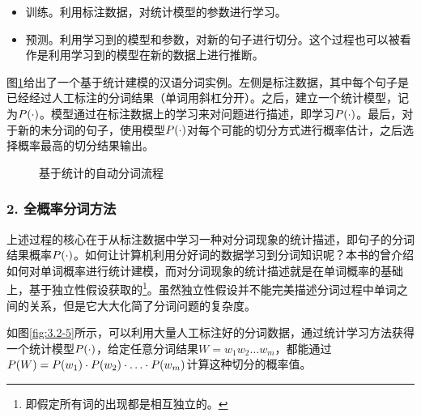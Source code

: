 \begin{itemize}
\vspace{0.5em}
\item 训练。利用标注数据，对统计模型的参数进行学习。
\vspace{0.5em}
\item 预测。利用学习到的模型和参数，对新的句子进行切分。这个过程也可以被看作是利用学习到的模型在新的数据上进行推断。
\vspace{0.5em}
\end{itemize}

\parinterval 图\ref{fig:3.2-4}给出了一个基于统计建模的汉语分词实例。左侧是标注数据，其中每个句子是已经经过人工标注的分词结果（单词用斜杠分开）。之后，建立一个统计模型，记为${P}(\cdot)$。模型通过在标注数据上的学习来对问题进行描述，即学习${P}(\cdot)$。最后，对于新的未分词的句子，使用模型${P}(\cdot)$对每个可能的切分方式进行概率估计，之后选择概率最高的切分结果输出。

\begin{figure}[htp]
\centering

\caption{基于统计的自动分词流程}
\label{fig:3.2-4}
\end{figure}


\subsubsection{2. 全概率分词方法}

\parinterval 上述过程的核心在于从标注数据中学习一种对分词现象的统计描述，即句子的分词结果概率${P}(\cdot)$。如何让计算机利用分好词的数据学习到分词知识呢？本书的{\chaptertwo}曾介绍如何对单词概率进行统计建模，而对分词现象的统计描述就是在单词概率的基础上，基于独立性假设获取的\footnote{即假定所有词的出现都是相互独立的。}。虽然独立性假设并不能完美描述分词过程中单词之间的关系，但是它大大化简了分词问题的复杂度。

\parinterval 如图\ref{fig:3.2-5}所示，可以利用大量人工标注好的分词数据，通过统计学习方法获得一个统计模型${P}(\cdot)$，给定任意分词结果$W = w_1w_2 \ldots w_m$，都能通过${P}(W)={P}(w_1) \cdot {P}(w_2) \cdot \ldots \cdot {P}(w_m)
$计算这种切分的概率值。

